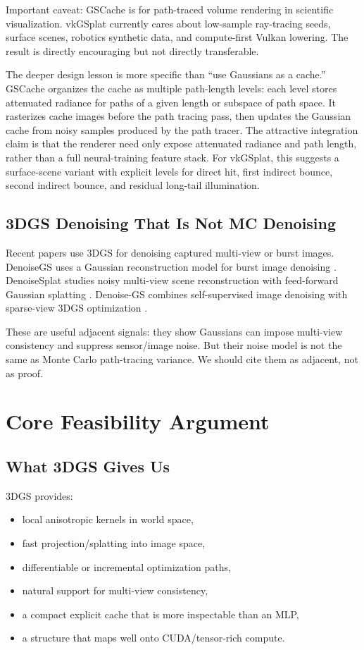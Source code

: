 \documentclass[11pt]{article}
\begin{document}
Important caveat: GSCache is for path-traced volume rendering in scientific
visualization. vkGSplat currently cares about low-sample ray-tracing seeds,
surface scenes, robotics synthetic data, and compute-first Vulkan lowering.
The result is directly encouraging but not directly transferable.

The deeper design lesson is more specific than ``use Gaussians as a cache.''
GSCache organizes the cache as multiple path-length levels: each level stores
attenuated radiance for paths of a given length or subspace of path space. It
rasterizes cache images before the path tracing pass, then updates the Gaussian
cache from noisy samples produced by the path tracer. The attractive integration
claim is that the renderer need only expose attenuated radiance and path length,
rather than a full neural-training feature stack. For vkGSplat, this suggests a
surface-scene variant with explicit levels for direct hit, first indirect bounce,
second indirect bounce, and residual long-tail illumination.

\subsection{3DGS Denoising That Is Not MC Denoising}

Recent papers use 3DGS for denoising captured multi-view or burst images.
DenoiseGS uses a Gaussian reconstruction model for burst image denoising
\cite{cheng2025denoisegs}. DenoiseSplat studies noisy multi-view scene
reconstruction with feed-forward Gaussian splatting \cite{jiang2026denoisesplat}.
Denoise-GS combines self-supervised image denoising with sparse-view 3DGS
optimization \cite{xu2026denoisegs}.

These are useful adjacent signals: they show Gaussians can impose multi-view
consistency and suppress sensor/image noise. But their noise model is not the
same as Monte Carlo path-tracing variance. We should cite them as adjacent,
not as proof.

\section{Core Feasibility Argument}

\subsection{What 3DGS Gives Us}

3DGS provides:

\begin{itemize}
  \item local anisotropic kernels in world space,
  \item fast projection/splatting into image space,
  \item differentiable or incremental optimization paths,
  \item natural support for multi-view consistency,
  \item a compact explicit cache that is more inspectable than an MLP,
  \item a structure that maps well onto CUDA/tensor-rich compute.
\end{itemize}
\end{document}
